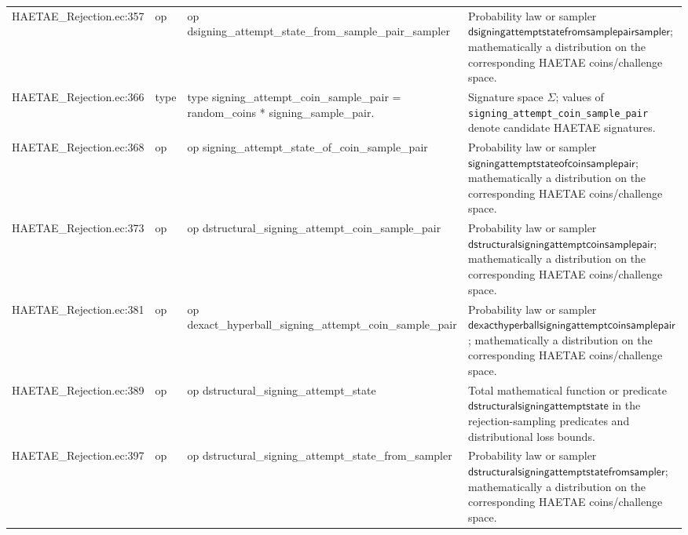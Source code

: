 \documentclass[10pt]{article}
\newcommand{\EC}[1]{\texttt{#1}}
\begin{document}
\begin{longtable}{L{0.11\textwidth}L{0.055\textwidth}L{0.385\textwidth}L{0.41\textwidth}}
HAETAE\_\allowbreak{}Rejection.\allowbreak{}ec:\allowbreak{}357 & op & {\ttfamily\scriptsize op dsigning\_\allowbreak{}attempt\_\allowbreak{}state\_\allowbreak{}from\_\allowbreak{}sample\_\allowbreak{}pair\_\allowbreak{}sampler} & Probability law or sampler $\mathsf{dsigningattemptstatefromsamplepairsampler}$; mathematically a distribution on the corresponding HAETAE coins/challenge space. \\
HAETAE\_\allowbreak{}Rejection.\allowbreak{}ec:\allowbreak{}366 & type & {\ttfamily\scriptsize type signing\_\allowbreak{}attempt\_\allowbreak{}coin\_\allowbreak{}sample\_\allowbreak{}pair = random\_\allowbreak{}coins * signing\_\allowbreak{}sample\_\allowbreak{}pair.} & Signature space $\Sigma$; values of \EC{signing\_attempt\_coin\_sample\_pair} denote candidate HAETAE signatures. \\
HAETAE\_\allowbreak{}Rejection.\allowbreak{}ec:\allowbreak{}368 & op & {\ttfamily\scriptsize op signing\_\allowbreak{}attempt\_\allowbreak{}state\_\allowbreak{}of\_\allowbreak{}coin\_\allowbreak{}sample\_\allowbreak{}pair} & Probability law or sampler $\mathsf{signingattemptstateofcoinsamplepair}$; mathematically a distribution on the corresponding HAETAE coins/challenge space. \\
HAETAE\_\allowbreak{}Rejection.\allowbreak{}ec:\allowbreak{}373 & op & {\ttfamily\scriptsize op dstructural\_\allowbreak{}signing\_\allowbreak{}attempt\_\allowbreak{}coin\_\allowbreak{}sample\_\allowbreak{}pair} & Probability law or sampler $\mathsf{dstructuralsigningattemptcoinsamplepair}$; mathematically a distribution on the corresponding HAETAE coins/challenge space. \\
HAETAE\_\allowbreak{}Rejection.\allowbreak{}ec:\allowbreak{}381 & op & {\ttfamily\scriptsize op dexact\_\allowbreak{}hyperball\_\allowbreak{}signing\_\allowbreak{}attempt\_\allowbreak{}coin\_\allowbreak{}sample\_\allowbreak{}pair} & Probability law or sampler $\mathsf{dexacthyperballsigningattemptcoinsamplepair}$; mathematically a distribution on the corresponding HAETAE coins/challenge space. \\
HAETAE\_\allowbreak{}Rejection.\allowbreak{}ec:\allowbreak{}389 & op & {\ttfamily\scriptsize op dstructural\_\allowbreak{}signing\_\allowbreak{}attempt\_\allowbreak{}state} & Total mathematical function or predicate $\mathsf{dstructuralsigningattemptstate}$ in the rejection-sampling predicates and distributional loss bounds. \\
HAETAE\_\allowbreak{}Rejection.\allowbreak{}ec:\allowbreak{}397 & op & {\ttfamily\scriptsize op dstructural\_\allowbreak{}signing\_\allowbreak{}attempt\_\allowbreak{}state\_\allowbreak{}from\_\allowbreak{}sampler} & Probability law or sampler $\mathsf{dstructuralsigningattemptstatefromsampler}$; mathematically a distribution on the corresponding HAETAE coins/challenge space. \\

\end{longtable}
\end{document}

